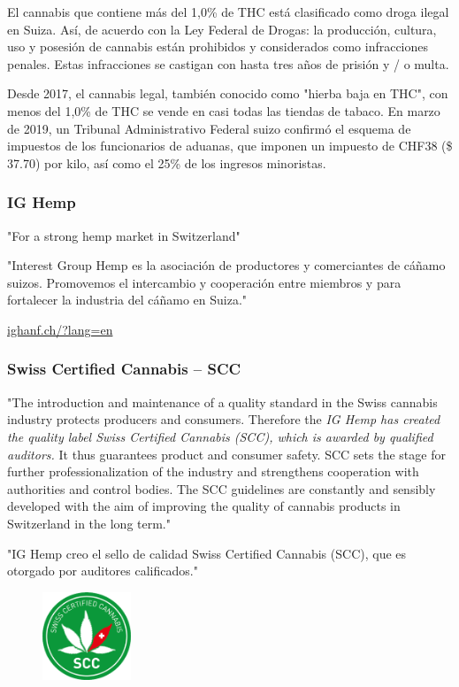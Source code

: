 \documentclass{article}
\begin{document}
El cannabis que contiene más del 1,0\% de THC está clasificado como droga ilegal en Suiza. Así, de acuerdo con la Ley Federal de Drogas: la producción, cultura, uso y posesión de cannabis están prohibidos y considerados como infracciones penales. Estas infracciones se castigan con hasta tres años de prisión y / o multa.

Desde 2017, el cannabis legal, también conocido como "hierba baja en THC", con menos del 1,0\% de THC se vende en casi todas las tiendas de tabaco. En marzo de 2019, un Tribunal Administrativo Federal suizo confirmó el esquema de impuestos de los funcionarios de aduanas, que imponen un impuesto de CHF38 (\$ 37.70) por kilo, así como el 25\% de los ingresos minoristas.

\subsubsection{IG Hemp}

\centerline{"For a strong hemp market in Switzerland"}

"Interest Group Hemp es la asociación de productores y comerciantes de cáñamo suizos. Promovemos el intercambio y cooperación entre miembros y para fortalecer la industria del cáñamo en Suiza." 

\url{ighanf.ch/?lang=en}

\subsubsection{Swiss Certified Cannabis – SCC}
"The introduction and maintenance of a quality standard in the Swiss cannabis industry protects producers and consumers. Therefore the \textit{IG Hemp has created the quality label Swiss Certified Cannabis (SCC), which is awarded by qualified auditors.} It thus guarantees product and consumer safety. SCC sets the stage for further professionalization of the industry and strengthens cooperation with authorities and control bodies. The SCC guidelines are constantly and sensibly developed with the aim of improving the quality of cannabis products in Switzerland in the long term."

"IG Hemp creo el sello de calidad Swiss Certified Cannabis (SCC), que es otorgado por auditores calificados."

\begin{figure}[H]
	\includegraphics[width=100px]{res/su-scc.png}
	\label{fig:suscc}
\end{figure}
\end{document}
